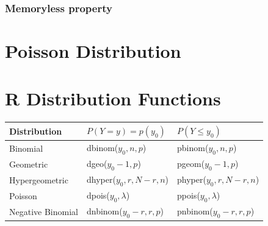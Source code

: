 \documentclass{article}
\theoremstyle{plain}
\theoremstyle{definition}
\theoremstyle{remark}
\begin{document}
\subsubsection{Memoryless property}


\section{Poisson Distribution}

\section{R Distribution Functions}
\begin{tabular}{l | l l}
Distribution & $P(Y=y) = p(y_0)$ & $P(Y \leq y_0)$\\
\hline
Binomial & dbinom($y_0,n,p$) & pbinom($y_0,n,p$)\\
Geometric & dgeo($y_0-1,p$) & pgeom($y_0-1,p$)\\
Hypergeometric & dhyper($y_0,r,N-r,n$) & phyper($y_0,r,N-r,n$)\\
Poisson & dpois($y_0,\lambda$) & ppois($y_0,\lambda$)\\  
Negative Binomial & dnbinom($y_0-r,r,p$) & pnbinom($y_0-r,r,p$)
\end{tabular}
\end{document}
